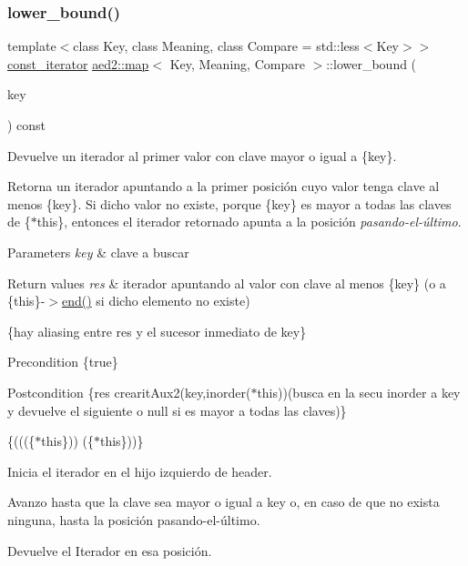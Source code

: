 \subsubsection{\texorpdfstring{lower\+\_\+bound()}{lower\_bound()}\hspace{0.1cm}{\footnotesize\ttfamily [1/4]}}
{\footnotesize\ttfamily template$<$class Key, class Meaning, class Compare = std\+::less$<$\+Key$>$$>$ \\
\hyperlink{classaed2_1_1map_1_1const__iterator}{const\+\_\+iterator} \hyperlink{classaed2_1_1map}{aed2\+::map}$<$ Key, Meaning, Compare $>$\+::lower\+\_\+bound (\begin{DoxyParamCaption}\item[{const Key \&}]{key }\end{DoxyParamCaption}) const\hspace{0.3cm}{\ttfamily [inline]}}



Devuelve un iterador al primer valor con clave mayor o igual a \{key\}. 

Retorna un iterador apuntando a la primer posición cuyo valor tenga clave al menos \{key\}. Si dicho valor no existe, porque \{key\} es mayor a todas las claves de \{$\ast$this\}, entonces el iterador retornado apunta a la posición {\itshape pasando-\/el-\/último}.


\begin{DoxyParams}{Parameters}
{\em key} & clave a buscar \\
\hline
\end{DoxyParams}

\begin{DoxyRetVals}{Return values}
{\em res} & iterador apuntando al valor con clave al menos \{key\} (o a \{this\}-\/$>$\hyperlink{classaed2_1_1map_a76023e6a56cb625513e1b5ea028bf983}{end()} si dicho elemento no existe)\\
\hline
\end{DoxyRetVals}
\{hay aliasing entre res y el sucesor inmediato de key\}

\begin{DoxyPrecond}{Precondition}
\{true\} 
\end{DoxyPrecond}
\begin{DoxyPostcond}{Postcondition}
\{res  crearit\+Aux2(key,inorder($\ast$this))(busca en la secu inorder a key y devuelve el siguiente o null si es mayor a todas las claves)\}
\end{DoxyPostcond}
\{(((\{$\ast$this\}))  (\{$\ast$this\}))\}
\begin{DoxyItemize}
\item Inicia el iterador en el hijo izquierdo de header.
\item Avanzo hasta que la clave sea mayor o igual a key o, en caso de que no exista ninguna, hasta la posición pasando-\/el-\/último.
\item Devuelve el Iterador en esa posición. 
\end{DoxyItemize}\mbox{\label{classaed2_1_1map_a62075a47afdf89267c5462f88164af3d}} 
